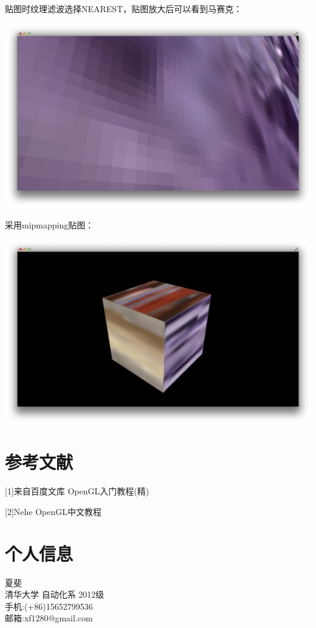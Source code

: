 \documentclass[12pt]{article}
\begin{document}
贴图时纹理滤波选择NEAREST，贴图放大后可以看到马赛克：
\begin{center}
\includegraphics[width = 6in]{5.png} 
\end{center}
采用mipmapping贴图：
\begin{center}
\includegraphics[width = 6in]{4.png} 
\end{center}

\section{参考文献}
[1]来自百度文库 OpenGL入门教程(精)

[2]Nehe OpenGL中文教程
\section{个人信息}
 \noindent
夏斐\\
清华大学 自动化系 2012级\\
手机:(+86)15652799536\\
邮箱:xf1280@gmail.com\\
\end{document}
